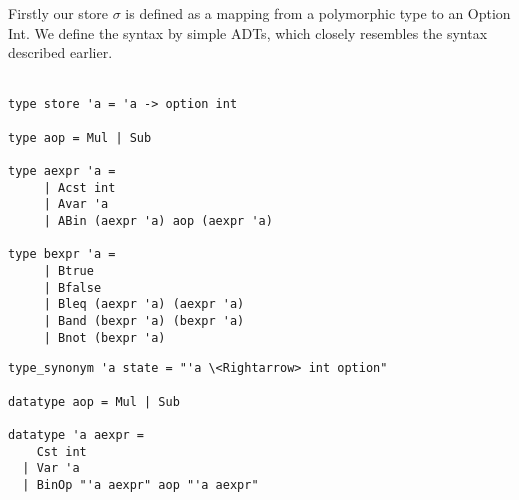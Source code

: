 Firstly our store $\sigma$ is defined as a mapping from a polymorphic type to an Option Int.
We define the syntax by simple ADTs, which closely resembles the syntax described earlier.
\\~\\
\noindent
\begin{minipage}{0.5\textwidth}
\begin{lstlisting}
type store 'a = 'a -> option int

type aop = Mul | Sub

type aexpr 'a =
     | Acst int
     | Avar 'a
     | ABin (aexpr 'a) aop (aexpr 'a)

type bexpr 'a =
     | Btrue
     | Bfalse
     | Bleq (aexpr 'a) (aexpr 'a)
     | Band (bexpr 'a) (bexpr 'a)
     | Bnot (bexpr 'a)
\end{lstlisting}
\end{minipage}
\hspace{0.01\textwidth}
\begin{minipage}{0.5\textwidth}
\begin{lstlisting}
type_synonym 'a state = "'a \<Rightarrow> int option"

datatype aop = Mul | Sub

datatype 'a aexpr =
    Cst int
  | Var 'a
  | BinOp "'a aexpr" aop "'a aexpr"
\end{lstlisting}
\end{minipage}